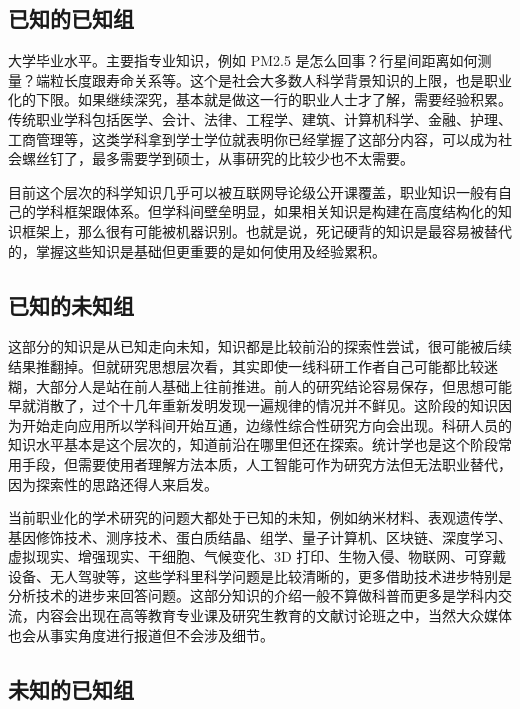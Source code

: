 \documentclass[]{tufte-book}
\begin{document}
\hypertarget{ux5df2ux77e5ux7684ux5df2ux77e5ux7ec4}{%
\subsection{已知的已知组}\label{ux5df2ux77e5ux7684ux5df2ux77e5ux7ec4}}

大学毕业水平。主要指专业知识，例如 PM2.5 是怎么回事？行星间距离如何测量？端粒长度跟寿命关系等。这个是社会大多数人科学背景知识的上限，也是职业化的下限。如果继续深究，基本就是做这一行的职业人士才了解，需要经验积累。传统职业学科包括医学、会计、法律、工程学、建筑、计算机科学、金融、护理、工商管理等，这类学科拿到学士学位就表明你已经掌握了这部分内容，可以成为社会螺丝钉了，最多需要学到硕士，从事研究的比较少也不太需要。

目前这个层次的科学知识几乎可以被互联网导论级公开课覆盖，职业知识一般有自己的学科框架跟体系。但学科间壁垒明显，如果相关知识是构建在高度结构化的知识框架上，那么很有可能被机器识别。也就是说，死记硬背的知识是最容易被替代的，掌握这些知识是基础但更重要的是如何使用及经验累积。

\hypertarget{ux5df2ux77e5ux7684ux672aux77e5ux7ec4}{%
\subsection{已知的未知组}\label{ux5df2ux77e5ux7684ux672aux77e5ux7ec4}}

这部分的知识是从已知走向未知，知识都是比较前沿的探索性尝试，很可能被后续结果推翻掉。但就研究思想层次看，其实即使一线科研工作者自己可能都比较迷糊，大部分人是站在前人基础上往前推进。前人的研究结论容易保存，但思想可能早就消散了，过个十几年重新发明发现一遍规律的情况并不鲜见。这阶段的知识因为开始走向应用所以学科间开始互通，边缘性综合性研究方向会出现。科研人员的知识水平基本是这个层次的，知道前沿在哪里但还在探索。统计学也是这个阶段常用手段，但需要使用者理解方法本质，人工智能可作为研究方法但无法职业替代，因为探索性的思路还得人来启发。

当前职业化的学术研究的问题大都处于已知的未知，例如纳米材料、表观遗传学、基因修饰技术、测序技术、蛋白质结晶、组学、量子计算机、区块链、深度学习、虚拟现实、增强现实、干细胞、气候变化、3D 打印、生物入侵、物联网、可穿戴设备、无人驾驶等，这些学科里科学问题是比较清晰的，更多借助技术进步特别是分析技术的进步来回答问题。这部分知识的介绍一般不算做科普而更多是学科内交流，内容会出现在高等教育专业课及研究生教育的文献讨论班之中，当然大众媒体也会从事实角度进行报道但不会涉及细节。

\hypertarget{ux672aux77e5ux7684ux5df2ux77e5ux7ec4}{%
\subsection{未知的已知组}\label{ux672aux77e5ux7684ux5df2ux77e5ux7ec4}}
\end{document}
